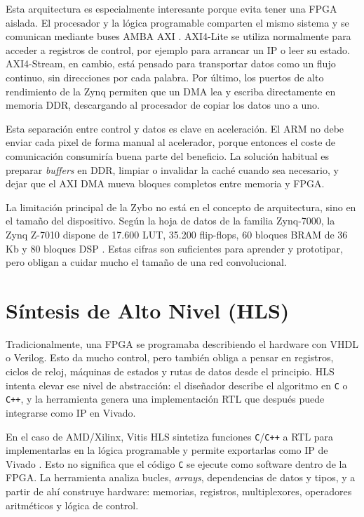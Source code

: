 Esta arquitectura es especialmente interesante porque evita tener una \ac{FPGA} aislada.
El procesador y
la lógica programable comparten el mismo sistema y se comunican mediante buses \ac{AMBA} \ac{AXI}
\citep{amdAxiDma}. AXI4-Lite
se utiliza normalmente para acceder a registros de control, por ejemplo para arrancar un
\ac{IP} o leer
su estado. AXI4-Stream, en cambio, está pensado para transportar datos como un flujo continuo, sin
direcciones por cada palabra. Por último, los puertos de alto rendimiento de la Zynq permiten que un
\ac{DMA} lea y escriba directamente en memoria \ac{DDR}, descargando al procesador de
copiar los datos uno a
uno.

Esta separación entre control y datos es clave en aceleración. El \ac{ARM} no debe enviar
cada pixel de
forma manual al acelerador, porque entonces el coste de comunicación consumiría buena parte del
beneficio. La solución habitual es preparar \textit{buffers} en \ac{DDR}, limpiar o
invalidar la caché cuando sea
necesario, y dejar que el \ac{AXI} \ac{DMA} mueva bloques completos entre memoria y \ac{FPGA}.

La limitación principal de la Zybo no está en el concepto de arquitectura, sino en el tamaño del
dispositivo. Según la hoja de datos de la familia Zynq-7000, la Zynq Z-7010 dispone de
17.600 \ac{LUT},
35.200 flip-flops, 60 bloques \ac{BRAM} de 36 Kb y 80 bloques \ac{DSP}
\citep{zynq7000Datasheet}. Estas
cifras son suficientes para aprender y prototipar, pero obligan a cuidar mucho el tamaño de una red
convolucional.

\section{Síntesis de Alto Nivel (HLS)}
Tradicionalmente, una \ac{FPGA} se programaba describiendo el hardware con \ac{VHDL} o
Verilog. Esto da mucho
control, pero también obliga a pensar en registros, ciclos de reloj, máquinas de estados y rutas de
datos desde el principio. \ac{HLS} intenta elevar ese nivel de abstracción:
el diseñador describe el algoritmo en \texttt{C} o \texttt{C++}, y la herramienta genera
una implementación \ac{RTL} que
después puede integrarse como \ac{IP} en Vivado.

En el caso de AMD/Xilinx, Vitis \ac{HLS} sintetiza funciones \texttt{C}/\texttt{C++} a
\ac{RTL} para implementarlas en la
lógica programable y permite exportarlas como \ac{IP} de Vivado \citep{amdVitisHLS}. Esto
no significa
que el código \texttt{C} se ejecute como software dentro de la \ac{FPGA}. La herramienta
analiza bucles, \textit{arrays},
dependencias de datos y tipos, y a partir de ahí construye hardware: memorias, registros,
multiplexores, operadores aritméticos y lógica de control.

